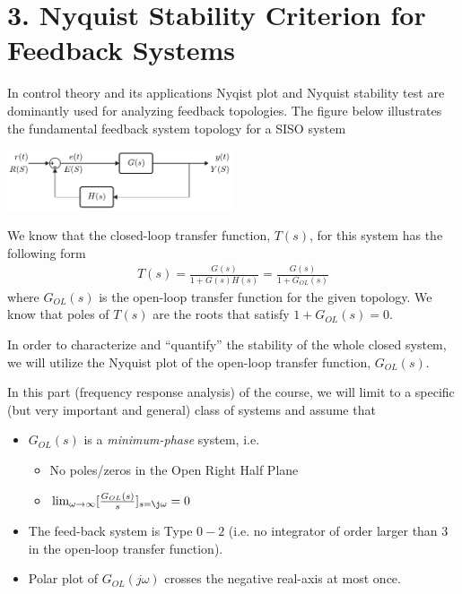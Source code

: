 \documentclass{article}
\begin{document}
\section*{3. Nyquist Stability Criterion for Feedback Systems}

In control theory and its applications Nyqist plot and Nyquist stability test are dominantly used for
analyzing feedback topologies. The figure below illustrates the fundamental feedback system topology for a SISO system

\vspace{6 pt}

  \begin{minipage}[h]{1\linewidth}
    \begin{center}
      \includegraphics[width=0.5\textwidth]{figs/unityfeedback}
    \end{center}
  \end{minipage}

\vspace{6 pt}

We know that the closed-loop transfer function, $T(s)$, for this
system has the following form
%
\begin{align*}
  T(s) = \frac{G(s)}{1 + G(s) H(s)} = \frac{G(s)}{1 + G_{OL}(s)}  
\end{align*}
%
where $G_{OL}(s)$ is the open-loop transfer function for the given
topology. We know that poles of $T(s)$ are the roots that satisfy 
$1 + G_{OL}(s) = 0$. 

In order to characterize and ``quantify'' the stability of the whole
closed system, we will utilize the Nyquist plot of the open-loop 
transfer function, $G_{OL}(s)$. 

In this part (frequency response analysis) of the course, we will
limit to a specific (but very important and general) class of systems 
and assume that 
%
\begin{itemize}
  \item $G_{OL}(s)$ is a \textit{minimum-phase} system, i.e.
    \begin{itemize}
      \item No poles/zeros in the Open Right Half Plane
      \item $\lim_{\omega \to \infty} [ \frac{G_{OL}(s)}{s} ]_{s = \j \omega} = 0 $
    \end{itemize}    
  \item The feed-back system is Type $0-2$ (i.e. no integrator of order larger than 3 in the open-loop transfer function). 
    \item Polar plot of $G_{OL}(j \omega)$ crosses the negative real-axis
      at most once. 
\end{itemize}
%
\end{document}
